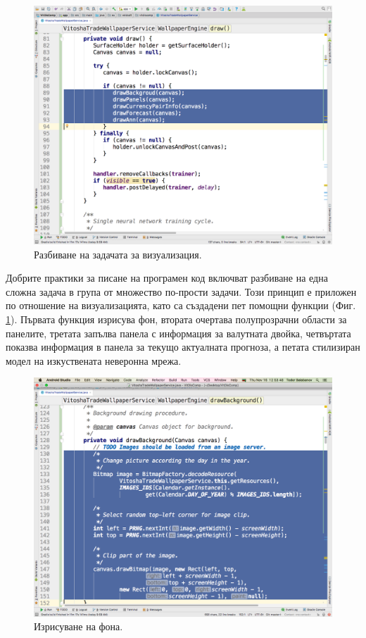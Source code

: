 \documentclass[book,14pt,oneside,openany]{memoir}
\begin{document}
\begin{figure}[h]
  \centering
  \includegraphics[height=0.45\pdfpageheight]{./images/pic0051.png}
  \caption{Разбиване на задачата за визуализация.}
\label{fig:pic0051}
\end{figure}
\FloatBarrier

Добрите практики за писане на програмен код включват разбиване на една сложна задача в група от множество по-прости задачи. Този принцип е приложен по отношение на визуализацията, като са създадени пет помощни функции (Фиг. \ref{fig:pic0051}).  Първата функция изрисува фон, втората очертава полупрозрачни области за панелите, третата запълва панела с информация за валутната двойка, четвъртата показва информация в панела за текущо актуалната прогноза, а петата стилизиран модел на изкуствената неверонна мрежа. 

\begin{figure}[h]
  \centering
  \includegraphics[height=0.45\pdfpageheight]{./images/pic0052.png}
  \caption{Изрисуване на фона.}
\label{fig:pic0052}
\end{figure}
\FloatBarrier
\end{document}
